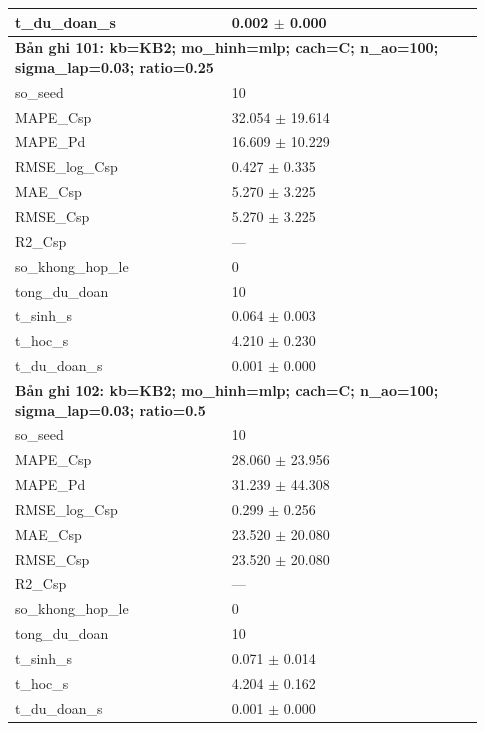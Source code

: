\begin{longtable}{p{0.43\linewidth}p{0.50\linewidth}}
t\_\allowbreak du\_\allowbreak doan\_\allowbreak s & 0.002 $\pm$ 0.000 \\
\midrule
\multicolumn{2}{p{0.95\linewidth}}{\textbf{Bản ghi 101: kb=KB2; mo\_hinh=mlp; cach=C; n\_ao=100; sigma\_lap=0.03; ratio=0.25}} \\
so\_\allowbreak seed & 10 \\
MAPE\_\allowbreak Csp & 32.054 $\pm$ 19.614 \\
MAPE\_\allowbreak Pd & 16.609 $\pm$ 10.229 \\
RMSE\_\allowbreak log\_\allowbreak Csp & 0.427 $\pm$ 0.335 \\
MAE\_\allowbreak Csp & 5.270 $\pm$ 3.225 \\
RMSE\_\allowbreak Csp & 5.270 $\pm$ 3.225 \\
R2\_\allowbreak Csp & — \\
so\_\allowbreak khong\_\allowbreak hop\_\allowbreak le & 0 \\
tong\_\allowbreak du\_\allowbreak doan & 10 \\
t\_\allowbreak sinh\_\allowbreak s & 0.064 $\pm$ 0.003 \\
t\_\allowbreak hoc\_\allowbreak s & 4.210 $\pm$ 0.230 \\
t\_\allowbreak du\_\allowbreak doan\_\allowbreak s & 0.001 $\pm$ 0.000 \\
\midrule
\multicolumn{2}{p{0.95\linewidth}}{\textbf{Bản ghi 102: kb=KB2; mo\_hinh=mlp; cach=C; n\_ao=100; sigma\_lap=0.03; ratio=0.5}} \\
so\_\allowbreak seed & 10 \\
MAPE\_\allowbreak Csp & 28.060 $\pm$ 23.956 \\
MAPE\_\allowbreak Pd & 31.239 $\pm$ 44.308 \\
RMSE\_\allowbreak log\_\allowbreak Csp & 0.299 $\pm$ 0.256 \\
MAE\_\allowbreak Csp & 23.520 $\pm$ 20.080 \\
RMSE\_\allowbreak Csp & 23.520 $\pm$ 20.080 \\
R2\_\allowbreak Csp & — \\
so\_\allowbreak khong\_\allowbreak hop\_\allowbreak le & 0 \\
tong\_\allowbreak du\_\allowbreak doan & 10 \\
t\_\allowbreak sinh\_\allowbreak s & 0.071 $\pm$ 0.014 \\
t\_\allowbreak hoc\_\allowbreak s & 4.204 $\pm$ 0.162 \\
t\_\allowbreak du\_\allowbreak doan\_\allowbreak s & 0.001 $\pm$ 0.000 \\

\end{longtable}
